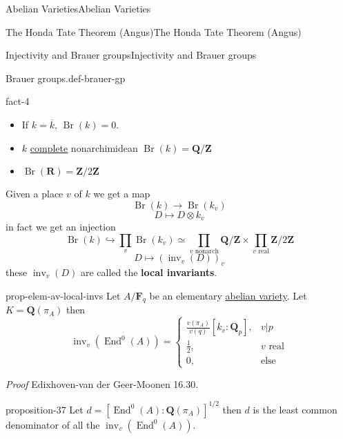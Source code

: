 \documentclass[10pt,]{book}
\makeatletter
\newcommand{\terminology}[1]{\textbf{#1}}
\renewcommand*{\proofname}{Proof}
\renewenvironment{proof}[1][\proofname]{\par
  \pushQED{\qed}%
  \normalfont \topsep6\p@\@plus6\p@\relax
  \trivlist
  \item\relax
    {\itshape
    #1\@addpunct{.}}\hspace\labelsep\ignorespaces
}{%
  \popQED\endtrivlist\@endpefalse
}
\numberwithin{equation}{section}
\newcommand{\lb}{[}
\newcommand{\rb}{]}
\newcommand{\ZZ}{\mathbf{Z}}
\newcommand{\QQ}{\mathbf{Q}}
\newcommand{\RR}{\mathbf{R}}
\newcommand{\FF}{\mathbf{F}}
\DeclareMathOperator{\End}{End}
\newcommand{\amp}{&}
\makeatother
\begin{document}
\begin{chapterptx}{Abelian Varieties}{}{Abelian Varieties}{}{}
\begin{sectionptx}{The Honda Tate Theorem (Angus)}{}{The Honda Tate Theorem (Angus)}{}{}
\begin{subsectionptx}{Injectivity and Brauer groups}{}{Injectivity and Brauer groups}{}{}
\begin{definition}{Brauer groups.}{def-brauer-gp}
\end{definition}
\begin{fact}{}{}{fact-4}%
\hypertarget{p-424}{}%
\leavevmode%
\begin{itemize}[label=\textbullet]
\item{}If \(k = \overline k\), \(\operatorname{Br}(k) = 0\).%
\item{}\(k\) \hyperref[def-abelian-complete-var]{complete} nonarchimidean \(\operatorname{Br}(k) = \QQ/\ZZ\)%
\item{}\(\operatorname{Br}(\RR) = \ZZ/2\ZZ\)%
\end{itemize}
Given a place \(v\) of \(k\) we get a map%
\begin{equation*}
\operatorname{Br}(k) \to \operatorname{Br}(k_v)
\end{equation*}
%
\begin{equation*}
D \mapsto D\otimes k_v
\end{equation*}
in fact we get an injection%
\begin{equation*}
\operatorname{Br}(k) \hookrightarrow \prod_v \operatorname{Br}(k_v) \simeq \prod_{v\text{ nonarch}} \QQ/\ZZ \times \prod_{v\text{ real}} \ZZ/2\ZZ
\end{equation*}
%
\begin{equation*}
D\mapsto (\operatorname{inv}_v(D))_v
\end{equation*}
these \(\operatorname{inv}_v(D)\) are called the \terminology{local invariants}.%
\end{fact}
\begin{proposition}{}{}{prop-elem-av-local-invs}%
\hypertarget{p-425}{}%
Let \(A/\FF_q\) be an elementary \hyperref[def-buntes-abvar]{abelian variety}. Let \(K = \QQ(\pi_A)\) then%
\begin{equation*}
\operatorname{inv}_v(\End^0(A)) = \begin{cases} \frac{v(\pi_A)}{v(q)} [k_v: \QQ_p], \amp v|p\\ \frac 12,\amp v\text{ real}\\ 0, \amp \text{else}\end{cases}
\end{equation*}
%
\end{proposition}
\begin{proof}\hypertarget{proof-72}{}
\hypertarget{p-426}{}%
Edixhoven-van der Geer-Moonen 16.30.%
\end{proof}
\begin{proposition}{}{}{proposition-37}%
\hypertarget{p-427}{}%
Let \(d= \lb \End^0(A) : \QQ(\pi_A) \rb^{1/2}\) then \(d\) is the least common denominator of all the \(\operatorname{inv}_v(\End^0(A))\).%

\end{proposition}
\end{subsectionptx}
\end{sectionptx}
\end{chapterptx}
\end{document}
